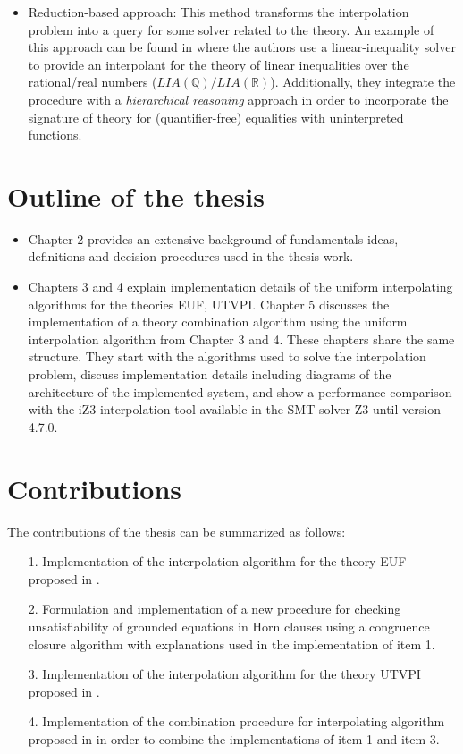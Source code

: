 \begin{itemize}
  \item Reduction-based approach: This method transforms the interpolation
    problem into a query for some solver related to the theory. 
    An example of this approach can be found in \cite{10.1007/978-3-540-69738-1_25}
    where the authors use a linear-inequality solver to provide an interpolant
    for the theory of linear inequalities over the rational/real numbers 
    ($LIA(\mathbb{Q})/LIA(\mathbb{R})$). 
    Additionally, they integrate the procedure with a 
    \emph{hierarchical reasoning} approach in order to incorporate 
    the signature of theory for (quantifier-free) equalities with uninterpreted 
    functions.
\end{itemize}

\section{Outline of the thesis}

\begin{itemize}
  \item Chapter 2 provides an extensive background 
    of fundamentals ideas, definitions and decision procedures 
    used in the thesis work.
  \item Chapters 3 and 4 explain implementation details
    of the uniform interpolating algorithms for the theories
    EUF, UTVPI. Chapter 5 discusses the implementation of
    a theory combination algorithm using the uniform 
    interpolation algorithm from Chapter 3 and 4. These
    chapters share the same structure. They start with the
    algorithms used to solve the interpolation problem, 
    discuss implementation details including diagrams
    of the architecture of the implemented system, and 
    show a performance comparison with the iZ3 interpolation 
    tool available in the SMT solver Z3 until version 4.7.0.
\end{itemize} 

\section{Contributions}

The contributions of the thesis can be summarized as follows:

\begin{itemize}
  \item[1.] Implementation of the interpolation algorithm for the theory EUF 
    proposed in \cite{KAPUR2017}.
  \item[2.] Formulation and implementation of a new 
    procedure for checking unsatisfiability of grounded equations in 
    Horn clauses using a congruence closure algorithm with explanations
    used in the implementation of item 1.
  \item[3.] Implementation of the interpolation algorithm for the theory UTVPI
    proposed in \cite{KAPUR2017}.
  \item[4.] Implementation of the combination procedure for interpolating
    algorithm proposed in \cite{10.1007/11532231_26} in order to 
    combine the implementations of item 1 and item 3.
\end{itemize}

